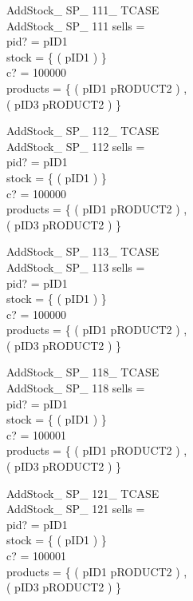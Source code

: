 \documentclass[fleqn,colorlinks,linkcolor=blue,citecolor=blue,urlcolor=blue]{article}
\newcommand{\negate}[0]{-}
\begin{document}
\begin{multicols}{2}
\begin{schema}{AddStock\_ SP\_ 111\_ TCASE}\\
 AddStock\_ SP\_ 111
\where
 sells =~\emptyset \\
 pid? = pID1 \\
 stock = \{ ( pID1  ) \} \\
 c? = 100000 \\
 products = \{ ( pID1 \mapsto pRODUCT2 ) , \\ ( pID3 \mapsto pRODUCT2 ) \}
\end{schema}


\begin{schema}{AddStock\_ SP\_ 112\_ TCASE}\\
 AddStock\_ SP\_ 112
\where
 sells =~\emptyset \\
 pid? = pID1 \\
 stock = \{ ( pID1  ) \} \\
 c? = 100000 \\
 products = \{ ( pID1 \mapsto pRODUCT2 ) , \\ ( pID3 \mapsto pRODUCT2 ) \}
\end{schema}


\begin{schema}{AddStock\_ SP\_ 113\_ TCASE}\\
 AddStock\_ SP\_ 113
\where
 sells =~\emptyset \\
 pid? = pID1 \\
 stock = \{ ( pID1  ) \} \\
 c? = 100000 \\
 products = \{ ( pID1 \mapsto pRODUCT2 ) , \\ ( pID3 \mapsto pRODUCT2 ) \}
\end{schema}


\begin{schema}{AddStock\_ SP\_ 118\_ TCASE}\\
 AddStock\_ SP\_ 118
\where
 sells =~\emptyset \\
 pid? = pID1 \\
 stock = \{ ( pID1 \mapsto \negate 4294967296 ) \} \\
 c? = 100001 \\
 products = \{ ( pID1 \mapsto pRODUCT2 ) , \\ ( pID3 \mapsto pRODUCT2 ) \}
\end{schema}


\begin{schema}{AddStock\_ SP\_ 121\_ TCASE}\\
 AddStock\_ SP\_ 121
\where
 sells =~\emptyset \\
 pid? = pID1 \\
 stock = \{ ( pID1  ) \} \\
 c? = 100001 \\
 products = \{ ( pID1 \mapsto pRODUCT2 ) , \\ ( pID3 \mapsto pRODUCT2 ) \}
\end{schema}



\end{multicols}
\end{document}
